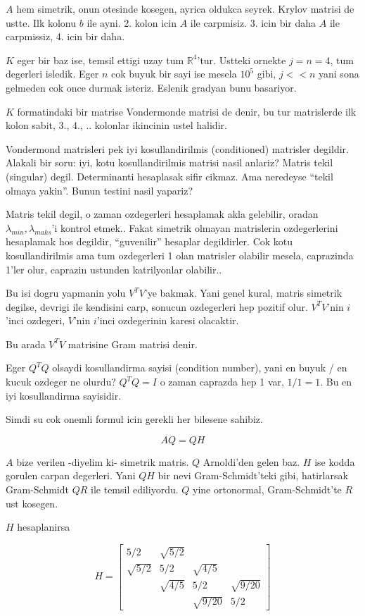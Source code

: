 \documentclass[12pt,fleqn]{article}\usepackage{../common}
\begin{document}
$A$ hem simetrik, onun otesinde kosegen, ayrica oldukca seyrek. Krylov
matrisi de ustte. Ilk kolonu $b$ ile ayni. 2. kolon icin $A$ ile
carpmisiz. 3. icin bir daha $A$ ile carpmissiz, 4. icin bir daha.

$K$ eger bir baz ise, temsil ettigi uzay tum $\mathbb{R}^4$'tur. Ustteki
ornekte $j = n = 4$, tum degerleri isledik. Eger $n$ cok buyuk bir sayi ise
mesela $10^5$ gibi, $j << n$ yani sona gelmeden cok once durmak
isteriz. Eslenik gradyan bunu basariyor. 

$K$ formatindaki bir matrise Vondermonde matrisi de denir, bu tur
matrislerde ilk kolon sabit, 3., 4., .. kolonlar ikincinin ustel 
halidir. 

Vondermond matrisleri pek iyi kosullandirilmis (conditioned) matrisler
degildir. Alakali bir soru: iyi, kotu kosullandirilmis matrisi nasil
anlariz? Matris tekil (singular) degil. Determinanti hesaplasak sifir
cikmaz. Ama neredeyse ``tekil olmaya yakin''. Bunun testini nasil yapariz? 

Matris tekil degil, o zaman ozdegerleri hesaplamak akla gelebilir,
oradan $\lambda_{min}, \lambda_{maks}$'i kontrol etmek.. Fakat simetrik
olmayan matrislerin ozdegerlerini hesaplamak hos degildir, ``guvenilir''
hesaplar degildirler. Cok kotu kosullandirilmis ama tum ozdegerleri 1 olan
matrisler olabilir mesela, caprazinda 1'ler olur, caprazin ustunden
katrilyonlar olabilir.. 

Bu isi dogru yapmanin yolu $V^TV$'ye bakmak. Yani genel kural, matris
simetrik degilse, devrigi ile kendisini carp, sonucun ozdegerleri hep
pozitif olur. $V^TV$'nin $i$'inci ozdegeri, $V$'nin $i$'inci ozdegerinin
karesi olacaktir. 

Bu arada $V^TV$ matrisine Gram matrisi denir. 

Eger $Q^TQ$ olsaydi kosullandirma sayisi (condition number), yani en buyuk /
en kucuk ozdeger ne olurdu? $Q^TQ = I$  o zaman caprazda hep 1 var, $1/1 =
1$. 
Bu en iyi kosullandirma sayisidir. 

Simdi su cok onemli formul icin gerekli her bilesene sahibiz. 

\[ AQ = QH \]

$A$ bize verilen -diyelim ki- simetrik matris. $Q$ Arnoldi'den gelen
baz. $H$ ise kodda gorulen carpan degerleri. Yani $QH$ bir nevi
Gram-Schmidt'teki gibi, hatirlarsak Gram-Schmidt $QR$ ile temsil
ediliyordu. $Q$ yine ortonormal, Gram-Schmidt'te $R$ ust kosegen. 

$H$ hesaplanirsa

\[  H = 
\left[\begin{array}{rrrr}
5/2 & \sqrt{ 5/2} && \\
\sqrt{ 5/2} & 5/2 & \sqrt{ 4/5}& \\
 & \sqrt{ 4/5} & 5/2 & \sqrt{ 9/20}\\
 &&  \sqrt{ 9/20} & 5/2 
\end{array}\right]
\]
\end{document}
